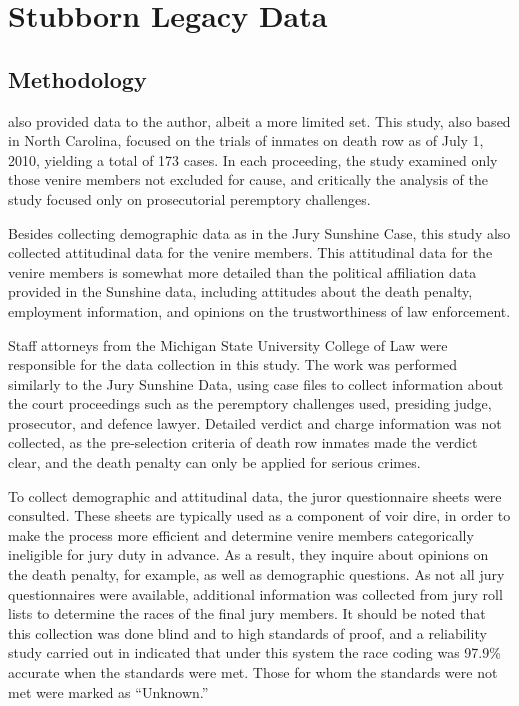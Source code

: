 \section{Stubborn Legacy Data} \label{sec:norcardata}

\subsection{Methodology}

\cite{StubbornLegacy} also provided data to the author, albeit a more limited set. This study, also based in North Carolina,
focused on the trials of inmates on death row as of July 1, 2010, yielding a total of 173 cases. In each proceeding, the study
examined only those venire members not excluded for cause, and critically the analysis of the study focused only on prosecutorial
peremptory challenges.

Besides collecting demographic data as in the Jury Sunshine Case, this study also collected attitudinal
data for the venire members. This attitudinal data for the venire members is somewhat more detailed than the political affiliation
data provided in the Sunshine data, including attitudes about the death penalty, employment information, and opinions on the
trustworthiness of law enforcement.

Staff attorneys from the Michigan State University College of Law were responsible for the data collection in this study. The work
was performed similarly to the Jury Sunshine Data, using case files to collect information about the court proceedings such as the
peremptory challenges used, presiding judge, prosecutor, and defence lawyer. Detailed verdict and charge information was not
collected, as the pre-selection criteria of death row inmates made the verdict clear, and the death penalty can only be applied
for serious crimes.

To collect demographic and attitudinal data, the juror questionnaire sheets were consulted. These sheets are typically used
as a component of voir dire, in order to make the process more efficient and determine venire members categorically ineligible for
jury duty in advance. As a result, they inquire about opinions on the death penalty, for example, as well as demographic questions. As not
all jury questionnaires were available, additional information was collected from jury roll lists to determine the races of the
final jury members. It should be noted that this collection was done blind and to high standards of proof, and a reliability study
carried out in \cite{StubbornLegacy} indicated that under this system the race coding was 97.9\% accurate when the standards were
met. Those for whom the standards were not met were marked as ``Unknown.''

